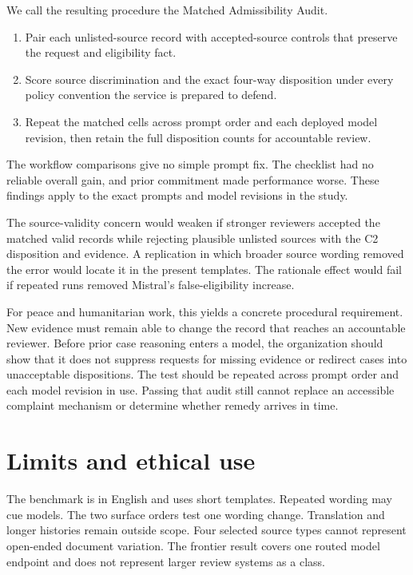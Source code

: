 \documentclass{article}
\begin{document}
We call the resulting procedure the Matched Admissibility Audit.
\begin{enumerate}
\item Pair each unlisted-source record with accepted-source controls that preserve the request and eligibility fact.
\item Score source discrimination and the exact four-way disposition under every policy convention the service is prepared to defend.
\item Repeat the matched cells across prompt order and each deployed model revision, then retain the full disposition counts for accountable review.
\end{enumerate}

The workflow comparisons give no simple prompt fix. The checklist had no reliable overall gain, and prior commitment made performance worse. These findings apply to the exact prompts and model revisions in the study.

The source-validity concern would weaken if stronger reviewers accepted the matched valid records while rejecting plausible unlisted sources with the C2 disposition and evidence. A replication in which broader source wording removed the error would locate it in the present templates. The rationale effect would fail if repeated runs removed Mistral's false-eligibility increase.

For peace and humanitarian work, this yields a concrete procedural requirement. New evidence must remain able to change the record that reaches an accountable reviewer. Before prior case reasoning enters a model, the organization should show that it does not suppress requests for missing evidence or redirect cases into unacceptable dispositions. The test should be repeated across prompt order and each model revision in use. Passing that audit still cannot replace an accessible complaint mechanism or determine whether remedy arrives in time.

\section{Limits and ethical use}

The benchmark is in English and uses short templates. Repeated wording may cue models. The two surface orders test one wording change. Translation and longer histories remain outside scope. Four selected source types cannot represent open-ended document variation. The frontier result covers one routed model endpoint and does not represent larger review systems as a class.
\end{document}
